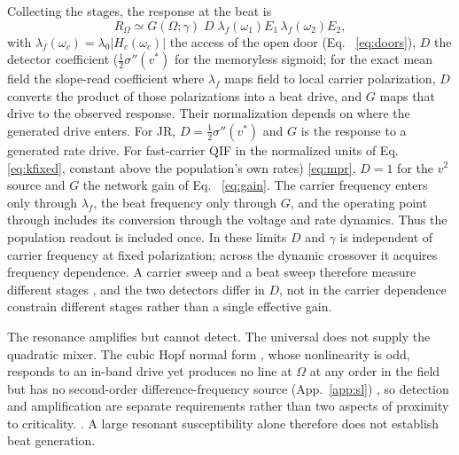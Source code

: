 \documentclass[11pt,a4paper]{article}
\newcommand{\Sig}{\sigma}
\newcommand{\half}{\tfrac{1}{2}}
\providecommand{\DIFaddtex}[1]{{\protect\color{blue} \sf #1}} %
\providecommand{\DIFdeltex}[1]{{\protect\color{red} \scriptsize #1}} %
\providecommand{\DIFaddbegin}{} %
\providecommand{\DIFaddend}{} %
\providecommand{\DIFdelbegin}{} %
\providecommand{\DIFdelend}{} %
\providecommand{\DIFadd}[1]{\texorpdfstring{\DIFaddtex{#1}}{#1}} %
\providecommand{\DIFdel}[1]{\texorpdfstring{\DIFdeltex{#1}}{}} %
\begin{document}
Collecting the stages, the response at the beat is
\begin{equation}
R_\Omega\simeq G(\Omega;\gamma)\;D\;\lambda_f(\omega_1)E_1\,\lambda_f(\omega_2)E_2 ,
\label{eq:receiver}
\end{equation}
\DIFdelbegin \DIFdel{with $\lambda_f(\omega_c)=\lambda_0|H_c(\omega_c)|$ the
access of the open door
(Eq. ~\eqref{eq:doors}), $D$ the detector coefficient ($\half\Sig''(v^*)$ for the memoryless
sigmoid; for the exact mean field the slope-read coefficient }\DIFdelend \DIFaddbegin \DIFadd{where $\lambda_f$ maps field to local carrier polarization, $D$ converts the
product of those polarizations into a beat drive, and $G$ maps that drive to the
observed response. Their normalization depends on where the generated drive enters.
For JR, $D=\half\Sig''(v^*)$ and $G$ is the response to a generated rate drive.
For fast-carrier QIF in the normalized units }\DIFaddend of Eq.~\DIFdelbegin \DIFdel{\eqref{eq:kfixed}, constant above the population's own rates) }\DIFdelend \DIFaddbegin \DIFadd{\eqref{eq:mpr}, $D=1$ for
the $v^2$ source }\DIFaddend and $G$ \DIFdelbegin \DIFdel{the network gain of
Eq. ~\eqref{eq:gain}. The carrier frequency enters only through $\lambda_f$, the beat
frequency only through $G$, and the operating point through }\DIFdelend \DIFaddbegin \DIFadd{includes its conversion through the voltage and rate
dynamics. Thus the population readout is included once. In these limits }\DIFaddend $D$ \DIFdelbegin \DIFdel{and $\gamma$}\DIFdelend \DIFaddbegin \DIFadd{is
independent of carrier frequency at fixed polarization; across the dynamic
crossover it acquires frequency dependence}\DIFaddend . A carrier sweep and a beat sweep
therefore \DIFdelbegin \DIFdel{measure different stages , and the two detectors differ in
$D$, not in the carrier dependence}\DIFdelend \DIFaddbegin \DIFadd{constrain different stages rather than a single effective gain}\DIFaddend .

The resonance \DIFdelbegin \DIFdel{amplifies but cannot detect. The universal }\DIFdelend \DIFaddbegin \DIFadd{does not supply the quadratic mixer. The cubic }\DIFaddend Hopf normal form
\DIFdelbegin \DIFdel{, whose
nonlinearity is odd, }\DIFdelend responds to an in-band drive \DIFdelbegin \DIFdel{yet produces no line at $\Omega$ at any
order in the field }\DIFdelend \DIFaddbegin \DIFadd{but has no second-order difference-frequency source
}\DIFaddend (App.~\ref{app:sl})\DIFdelbegin \DIFdel{, so detection and amplification are separate
requirements rather than two aspects of proximity to criticality. }\DIFdelend \DIFaddbegin \DIFadd{. A large resonant susceptibility alone therefore does not
establish beat generation.
}\DIFaddend
\end{document}
